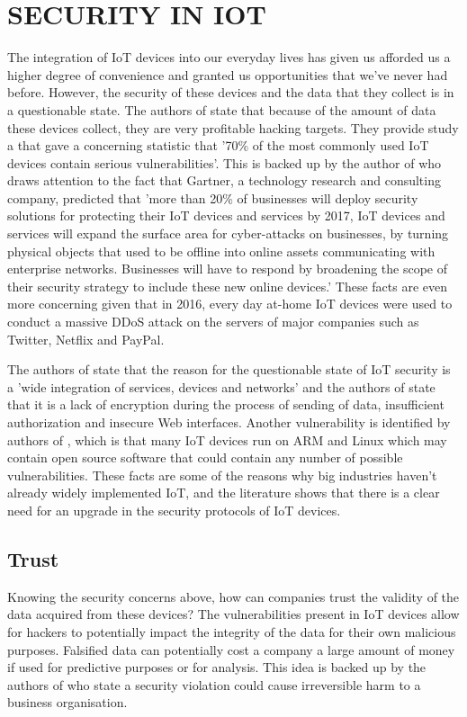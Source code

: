 \documentclass[transmag]{IEEEtran}
\begin{document}
\section{SECURITY IN IOT}
The integration of IoT devices into our everyday lives has given us afforded us a higher degree of convenience and granted us opportunities that we've never had before. However, the security of these devices and the data that they collect is in a questionable state. The authors of \cite{ref4} state that because of the amount of data these devices collect, they are very profitable hacking targets. They provide study a that gave a concerning statistic that '70\% of the most commonly used IoT devices contain serious vulnerabilities'. This is backed up by the author of\cite{ref3} who draws attention to the fact that Gartner, a technology research and consulting company, predicted that ’more than 20\% of businesses will deploy security solutions for protecting their IoT devices and services by 2017, IoT devices and services will expand the surface area for cyber-attacks on businesses, by turning physical objects that used to be offline into online assets communicating with enterprise networks. Businesses will have to respond by broadening the scope of their security strategy to include these new online devices.’ These facts are even more concerning given that in 2016, every day at-home IoT devices were used to conduct a massive DDoS attack on the servers of major companies such as Twitter, Netflix and PayPal\cite{ref6}.
\par The authors of \cite{ref5} state that the reason for the questionable state of IoT security is a 'wide integration of services, devices and networks' and the authors of \cite{ref4} state that it is a lack of encryption during the process of sending of data, insufficient authorization and insecure Web interfaces. Another vulnerability is identified by authors of \cite{ref10}, which is that many IoT devices run on ARM and Linux which may contain open source software that could contain any number of possible vulnerabilities. These facts are some of the reasons why big industries haven't already widely implemented IoT, and the literature shows that there is a clear need for an upgrade in the security protocols of IoT devices.

\subsection{Trust}
Knowing the security concerns above, how can companies trust the validity of the data acquired from these devices? The vulnerabilities present in IoT devices allow for hackers to potentially impact the integrity of the data for their own malicious purposes. Falsified data can potentially cost a company a large amount of money if used for predictive purposes or for analysis. This idea is backed up by the authors of \cite{ref8} who state a security violation could cause irreversible harm to a business organisation.
\end{document}
